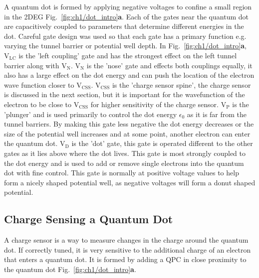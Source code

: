 A quantum dot is formed by applying negative voltages to confine a small region in the 2DEG Fig.~\ref{fig:ch1/dot_intro}\textbf{a}.
Each of the gates near the quantum dot are capacitively coupled to parameters that determine different energies in the dot. 
Careful gate design was used so that each gate has a primary function e.g. varying the tunnel barrier or potential well depth. In Fig.~\ref{fig:ch1/dot_intro}\textbf{a}, $\mathrm{V_{LC}}$ is the 'left coupling' gate and has the strongest effect on the left tunnel barrier along with $\mathrm{V_{N}}$. $\mathrm{V_{N}}$ is the 'nose' gate and effects both couplings equally, it also has a large effect on the dot energy and can push the location of the electron wave function closer to $\mathrm{V_{CSS}}$. $\mathrm{V_{CSS}}$ is the 'charge sensor spine', the charge sensor is discussed in the next section, but it is important for the wavefunction of the electron to be close to $\mathrm{V_{CSS}}$ for higher sensitivity of the charge sensor. $\mathrm{V_{P}}$ is the 'plunger' and is used primarily to control the dot energy $\epsilon_0$ as it is far from the tunnel barriers. By making this gate less negative the dot energy decreases or the size of the potential well increases and at some point, another electron can enter the quantum dot. $\mathrm{V_{D}}$ is the 'dot' gate, this gate is operated different to the other gates as it lies above where the dot lives. This gate is most strongly coupled to the dot energy and is used to add or remove single electrons into the quantum dot with fine control. This gate is normally at positive voltage values to help form a nicely shaped potential well, as negative voltages will form a donut shaped potential. 





\afterpage{\clearpage}
\subsection{Charge Sensing a Quantum Dot}


A charge sensor is a way to measure changes in the charge around the quantum dot. If correctly tuned, it is very sensitive to the additional charge of an electron that enters a quantum dot. It is formed by adding a QPC in close proximity to the quantum dot Fig.~\ref{fig:ch1/dot_intro}\textbf{a}. 

